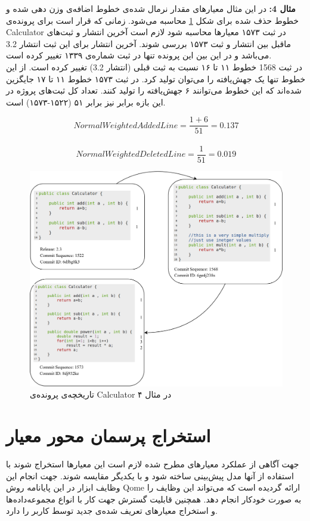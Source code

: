  
\textbf{مثال 4:}
در این مثال معیار‌های مقدار نرمال شده‌ی خطوط اضافه‌ی وزن دهی شده و خطوط حذف شده برای شکل \ref{fig:example3} محاسبه می‌شود. زمانی که قرار است برای پرونده‌ی Calculator  در ثبت ۱۵۷۳ معیارها محاسبه شود لازم است آخرین انتشار و ثبت‌های ماقبل بین انتشار و ثبت ۱۵۷۳ بررسی شوند. آخرین انتشار برای این ثبت انتشار  3.2 می‌باشد و  در این بین این پرونده تنها در ثبت شماره‌ی ۱۳۳۹ تغییر کرده است. \\
در ثبت 1568 خطوط ۱۱ تا ۱۶ نسبت به ثبت قبلی (انتشار 3.2) تغییر کرده است. از این خطوط تنها یک جهش‌یافته را می‌توان تولید کرد. در ثبت ۱۵۷۳ خطوط ۱۱ تا ۱۷ جایگزین شده‌اند که این خطوط می‌توانند ۶ جهش‌یافته را تولید کنند. تعداد کل ثبت‌های پروژه در این بازه  برابر نیز برابر ۵۱ 
(۱۵۲۲-۱۵۷۳) 
است. 
\begin{latin}
\[
NormalWeightedAddedLine = \frac{1+6}{51} = 0.137\]\\
\[
NormalWeightedDeletedLine = \frac{1}{51} = 0.019
\]
\end{latin}



\begin{figure}[H]
	\centering
	\includegraphics[width=1\textwidth]{img/method/example3.png}
	\caption{ تاریخچه‌ی پرونده‌ی Calculator در مثال ۴}
	\label{fig:example3}
\end{figure}

\section{استخراج پرسمان محور معیار}
جهت آگاهی از عملکرد معیارهای مطرح شده لازم است این معیارها استخراج شوند با استفاده از آنها مدل پیش‌بینی ساخته شود و با یکدیگر مقایسه شوند. جهت انجام این وظایف ابزار  در این پایانامه روش Qome ارائه گردیده است که می‌تواند این وظایف را به صورت خودکار انجام دهد. همچنین قابلیت گسترش جهت کار با انواع مجموعه‌داده‌ها و استخراج معیارهای تعریف شده‌ی جدید توسط کاربر را دارد. 

